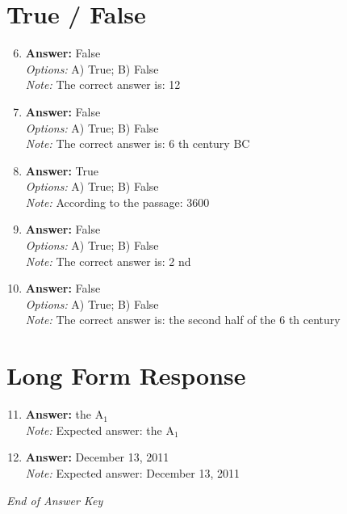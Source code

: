 \documentclass[12pt]{article}
\begin{document}
\section*{True / False}
\begin{enumerate}[label=\arabic*.]
\setcounter{enumi}{5}
\item \textbf{Answer:} False
\\ \textit{Options:} A) True; B) False
\\ \textit{Note:} The correct answer is: 12
\item \textbf{Answer:} False
\\ \textit{Options:} A) True; B) False
\\ \textit{Note:} The correct answer is: 6 th century BC
\item \textbf{Answer:} True
\\ \textit{Options:} A) True; B) False
\\ \textit{Note:} According to the passage: 3600
\item \textbf{Answer:} False
\\ \textit{Options:} A) True; B) False
\\ \textit{Note:} The correct answer is: 2 nd
\item \textbf{Answer:} False
\\ \textit{Options:} A) True; B) False
\\ \textit{Note:} The correct answer is: the second half of the 6 th century
\end{enumerate}

\section*{Long Form Response}
\begin{enumerate}[label=\arabic*.]
\setcounter{enumi}{10}
\item \textbf{Answer:} the A$_{1}$
\\ \textit{Note:} Expected answer: the A$_{1}$
\item \textbf{Answer:} December 13, 2011
\\ \textit{Note:} Expected answer: December 13, 2011
\end{enumerate}

\vfill
\noindent\textit{End of Answer Key}
\end{document}
